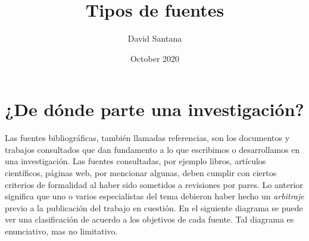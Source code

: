 \documentclass[12pt]{article}
\title{Tipos de fuentes}
\author{David Santana}
\date{October 2020}
\begin{document}
\maketitle

\section*{¿De dónde parte una investigación?}
Las fuentes bibliográficas, también llamadas referencias, son los documentos y trabajos consultados que dan fundamento a lo que escribimos o desarrollamos en una investigación. Las fuentes consultadas, por ejemplo libros, artículos científicos, páginas web, por mencionar algunas, deben cumplir con ciertos criterios de formalidad al haber sido sometidos a revisiones por pares. Lo anterior significa que uno o varios especialistas del tema debieron haber hecho un \emph{arbitraje} previo a la publicación del trabajo en cuestión. En el siguiente diagrama se puede ver una clasificación de acuerdo a los objetivos de cada fuente. Tal diagrama es enunciativo, mas no limitativo.
\vspace{1cm}


\vspace{1cm}

\begin{center}
\begin{minipage}[c]{1\textwidth}
\end{minipage}
\end{center}

\vspace{1cm}

\begin{center}
\begin{minipage}[c]{1\textwidth}
\end{minipage}
\end{center}
\end{document}
